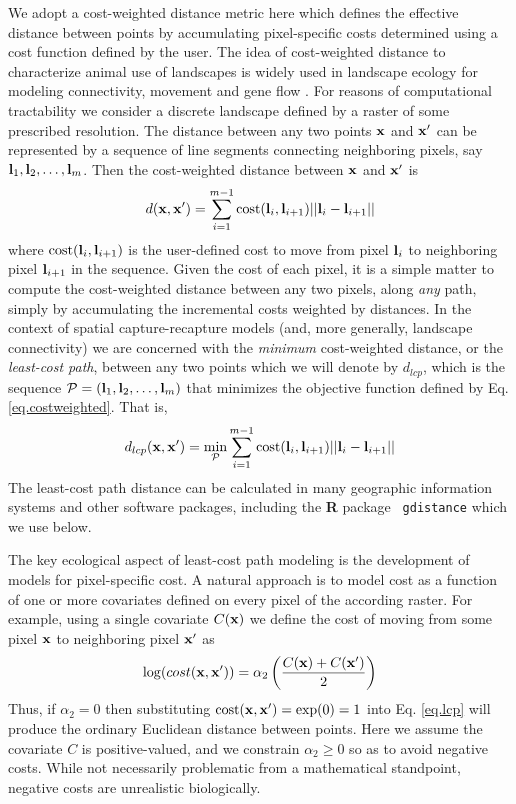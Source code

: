 We adopt a cost-weighted distance metric here which defines the
effective distance between points by accumulating pixel-specific costs
determined using a cost function defined by the user.  The idea of
cost-weighted distance to characterize animal use of landscapes is
widely used in landscape ecology for modeling connectivity, movement
and gene flow \citep{beier_etal:2008}. For reasons of computational
tractability we consider a discrete landscape defined by a raster of
some prescribed resolution. The distance between any two points ${\bf
  x}$ and ${\bf x}'$ can be represented by a sequence of line segments
connecting neighboring pixels, say ${\bf l}_{1},{\bf
  l}_{2},\ldots,{\bf l}_{m}$. Then the cost-weighted distance between
${\bf x}$ and ${\bf x}'$ is
\begin{equation}
 d({\bf x},{\bf x}')
  =  \sum_{i=1}^{m-1} \mbox{cost}({\bf l}_{i},{\bf l}_{i+1})||{\bf l}_{i} - {\bf l}_{i+1}||
\label{eq.costweighted}
\end{equation}
where $\mbox{cost}({\bf l}_{i},{\bf l}_{i+1})$ is the user-defined cost to
move from pixel ${\bf l}_{i}$ to neighboring pixel ${\bf l}_{i+1}$ in
the sequence.  Given the cost of each pixel, it is a simple matter to
compute the cost-weighted distance between any two pixels, along {\it
  any} path, simply by accumulating the incremental costs weighted by
distances.  In the context of spatial capture-recapture models (and,
more generally, landscape connectivity) we are concerned with the {\it
  minimum} cost-weighted distance, or the {\it least-cost path},
between any two points which we will denote by $d_{lcp}$, which is the
sequence ${\cal P} = ({\bf l}_{1},{\bf l}_{2},\ldots,{\bf l}_{m})$
that minimizes the objective function defined by
Eq. \ref{eq.costweighted}. That is,
\begin{equation}
 d_{lcp}({\bf x},{\bf x}')
  =  \min_{{\cal P}} \sum_{i=1}^{m-1} \mbox{cost}({\bf l}_{i},{\bf l}_{i+1})||{\bf l}_{i} - {\bf l}_{i+1}||
\label{eq.lcp}
\end{equation}
The least-cost path distance can be calculated in
 many geographic information systems and other software packages,
including the {\bf R} package \mbox{\tt
  gdistance} \citep{vanetten:2011} which we use below.

The key ecological aspect of least-cost path modeling is the
development
of models for pixel-specific cost.
A natural approach is to
model cost as a function of one or more covariates
defined on every pixel of the according raster. For example, using a
single covariate $C({\bf x})$ we define the cost of moving from some pixel
${\bf x}$ to neighboring pixel ${\bf x}'$ as
\begin{equation}
\log(  cost({\bf x},{\bf x}'))=  \alpha_{2}\left( \frac{C({\bf
      x})+C({\bf x}')}{2}
\right)
\label{ecoldist.eq.cost}
\end{equation}
Thus, if $\alpha_{2} = 0$ then substituting $\mbox{cost}({\bf x},{\bf x}')
=\exp(0) = 1$ into
Eq. \ref{eq.lcp} will produce the ordinary Euclidean distance
between points. Here we assume the covariate $C$ is positive-valued,
and we constrain $\alpha_{2}\ge 0$ so as to avoid
negative costs. While not necessarily problematic from a mathematical
standpoint, negative costs are unrealistic biologically.

